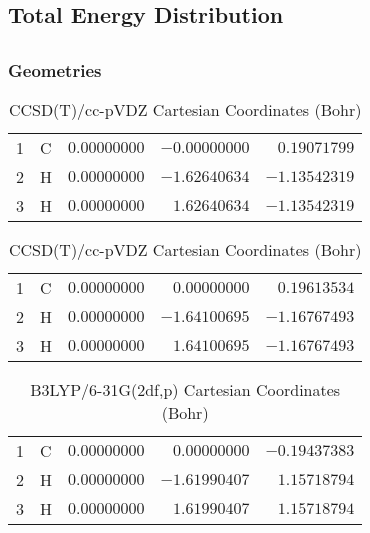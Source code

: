 \documentclass[10pt,oneside]{article}
\begin{document}
\begin{table}
\subsection*{Total Energy Distribution}
\centering\end{table}

\clearpage

\subsection{}

\begin{table}[h!]
\subsubsection*{Geometries}
\begin{multicols}{2}
\centering
\caption{CCSD(T)/cc-pVTZ Cartesian Coordinates (Bohr)}
\begin{tabular}{llrrr}
\toprule
1  & C  & $ 0.00000000$ & $-0.00000000$ & $ 0.19071799$ \\
2  & H  & $ 0.00000000$ & $-1.62640634$ & $-1.13542319$ \\
3  & H  & $ 0.00000000$ & $ 1.62640634$ & $-1.13542319$ \\
\bottomrule
\end{tabular}
\caption{CCSD(T)/cc-pVDZ Cartesian Coordinates (Bohr)}
\begin{tabular}{llrrr}
\toprule
1  & C  & $ 0.00000000$ & $ 0.00000000$ & $ 0.19613534$ \\
2  & H  & $ 0.00000000$ & $-1.64100695$ & $-1.16767493$ \\
3  & H  & $ 0.00000000$ & $ 1.64100695$ & $-1.16767493$ \\
\bottomrule
\end{tabular}
\end{multicols}
\end{table}

\begin{table}[h]
\centering
\caption{B3LYP/6-31G(2df,p) Cartesian Coordinates (Bohr)}
\begin{tabular}{llrrr}
\toprule
1  & C  & $ 0.00000000$ & $ 0.00000000$ & $-0.19437383$ \\
2  & H  & $ 0.00000000$ & $-1.61990407$ & $ 1.15718794$ \\
3  & H  & $ 0.00000000$ & $ 1.61990407$ & $ 1.15718794$ \\
\bottomrule
\end{tabular}
\end{table}
\end{document}
